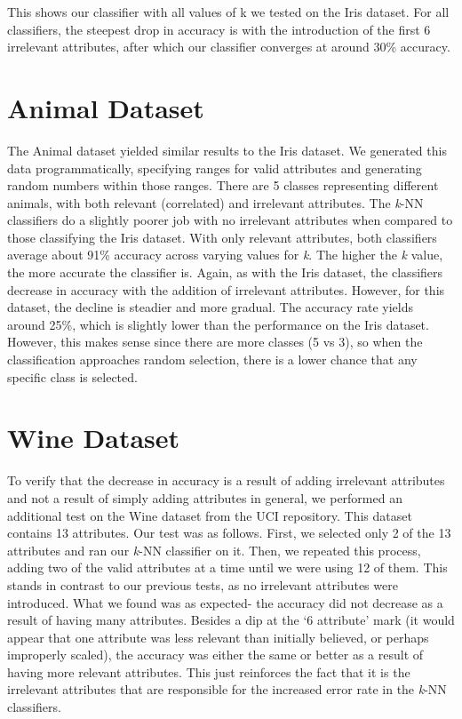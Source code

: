 \documentclass{article}
\begin{document}
This shows our classifier with all values of k we tested on the Iris dataset. For all classifiers, the steepest drop in accuracy is with the introduction of the first 6 irrelevant attributes, after which our classifier converges at around 30\% accuracy. \\


\section{Animal Dataset}

The Animal dataset yielded similar results to the Iris dataset. We generated this data programmatically, specifying ranges for valid attributes and generating random numbers within those ranges. There are 5 classes representing different animals, with both relevant (correlated) and irrelevant attributes. The \textit{k}-NN classifiers do a slightly poorer job with no irrelevant attributes when compared to those classifying the Iris dataset. With only relevant attributes, both classifiers average about 91\% accuracy across varying values for \textit{k}. The higher the \textit{k} value, the more accurate the classifier is. Again, as with the Iris dataset, the classifiers decrease in accuracy with the addition of irrelevant attributes. However, for this dataset, the decline is steadier and more gradual. The accuracy rate yields around 25\%, which is slightly lower than the performance on the Iris dataset. However, this makes sense since there are more classes (5 vs 3), so when the classification approaches random selection, there is a lower chance that any specific class is selected.

\section{Wine Dataset}

To verify that the decrease in accuracy is a result of adding irrelevant attributes and not a result of simply adding attributes in general, we performed an additional test on the Wine dataset from the UCI repository. This dataset contains 13 attributes. Our test was as follows. First, we selected only 2 of the 13 attributes and ran our \textit{k}-NN classifier on it. Then, we repeated this process, adding two of the valid attributes at a time until we were using 12 of them. This stands in contrast to our previous tests, as no irrelevant attributes were introduced. What we found was as expected- the accuracy did not decrease as a result of having many attributes. Besides a dip at the ‘6 attribute’ mark (it would appear that one attribute was less relevant than initially believed, or perhaps improperly scaled), the accuracy was either the same or better as a result of having more relevant attributes. This just reinforces the fact that it is the irrelevant attributes that are responsible for the increased error rate in the \textit{k}-NN classifiers.
\end{document}

